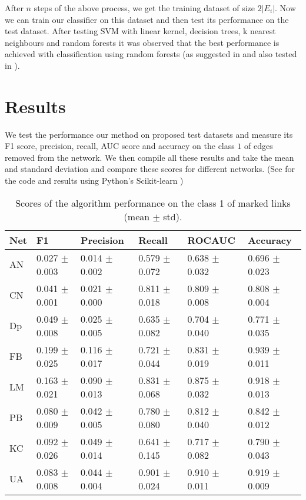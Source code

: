 \documentclass{llncs}
\begin{document}
After $n$ steps of the above process, we get the training dataset of size $2 |E_i|$. Now we can train our classifier on this dataset and then test its performance on the test dataset. After testing SVM with linear kernel, decision trees, k nearest neighbours and random forests it was observed that the best performance is achieved with classification using random forests (as suggested in \cite{features-for-sl} and also tested in \cite{ipynb-sl}).
%
\section{Results}
%
We test the performance our method on proposed test datasets and measure its F1 score, precision, recall, AUC score and accuracy on the class $1$ of edges removed from the network. We then compile all these results and take the mean and standard deviation and compare these scores for different networks. (See \cite{ipynb-sl} for the code and results using Python's Scikit-learn \cite{scikit})
%
\setlength{\tabcolsep}{5pt}
\renewcommand{\arraystretch}{1.5}
\begin{table}
\begin{center}
\caption{Scores of the algorithm performance on the class 1 of marked links (mean $\pm$ std).}
\begin{tabular}{| l | l | l | l | l | l |}
\hline
Net & F1 & Precision & Recall & ROCAUC & Accuracy  \\ \hline
AN & 0.027 $\pm$ 0.003 & 0.014 $\pm$ 0.002 & 0.579 $\pm$ 0.072 & 0.638 $\pm$ 0.032 & 0.696 $\pm$ 0.023  \\ \hline
CN & 0.041 $\pm$ 0.001 & 0.021 $\pm$ 0.000 & 0.811 $\pm$ 0.018 & 0.809 $\pm$ 0.008 & 0.808 $\pm$ 0.004  \\ \hline
Dp & 0.049 $\pm$ 0.008 & 0.025 $\pm$ 0.005 & 0.635 $\pm$ 0.082 & 0.704 $\pm$ 0.040 & 0.771 $\pm$ 0.035  \\ \hline
FB & 0.199 $\pm$ 0.025 & 0.116 $\pm$ 0.017 & 0.721 $\pm$ 0.044 & 0.831 $\pm$ 0.019 & 0.939 $\pm$ 0.011  \\ \hline
LM & 0.163 $\pm$ 0.021 & 0.090 $\pm$ 0.013 & 0.831 $\pm$ 0.068 & 0.875 $\pm$ 0.032 & 0.918 $\pm$ 0.013 \\ \hline
PB & 0.080 $\pm$ 0.009 & 0.042 $\pm$ 0.005 & 0.780 $\pm$ 0.080 & 0.812 $\pm$ 0.040 & 0.842 $\pm$ 0.012  \\ \hline
KC & 0.092 $\pm$ 0.026 & 0.049 $\pm$ 0.014 & 0.641 $\pm$ 0.145 & 0.717 $\pm$ 0.082 & 0.790 $\pm$  0.043 \\ \hline
UA & 0.083 $\pm$ 0.008 & 0.044 $\pm$ 0.004 & 0.901 $\pm$ 0.024 & 0.910 $\pm$ 0.011 & 0.919 $\pm$ 0.009  \\ 
\hline
\end{tabular}
\end{center}
\end{table}
%
\end{document}
